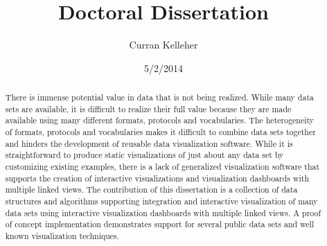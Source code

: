 \documentclass[12pt]{report}
\title{Doctoral Dissertation}
\author{Curran Kelleher}
\date{5/2/2014}
\begin{document}
\maketitle 

\begin{onehalfspacing}
\begin{abstract}
There is immense potential value in data that is not being realized. While many data sets are available, it is difficult to realize their full value because they are made available using many different formats, protocols and vocabularies. The heterogeneity of formats, protocols and vocabularies makes it difficult to combine data sets together and hinders the development of reusable data visualization software. While it is straightforward to produce static visualizations of just about any data set by customizing existing examples, there is a lack of generalized visualization software that supports the creation of interactive visualizations and visualization dashboards with multiple linked views. The contribution of this dissertation is a collection of data structures and algorithms supporting integration and interactive visualization of many data sets using interactive visualization dashboards with multiple linked views. A proof of concept implementation demonstrates support for several public data sets and well known visualization techniques.
\end{abstract}
\end{onehalfspacing}

\pagebreak

\tableofcontents

\pagebreak
\end{document}
